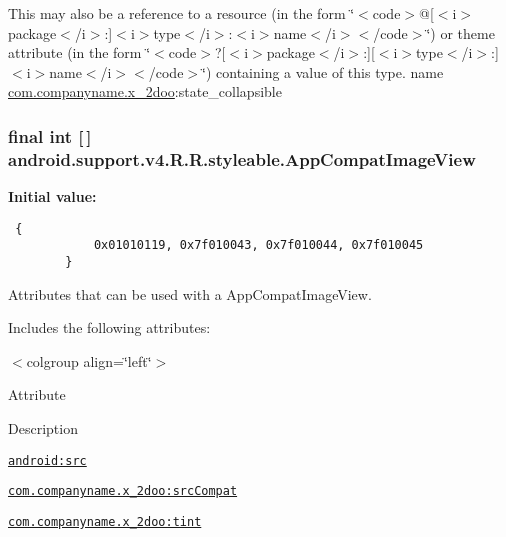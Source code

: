This may also be a reference to a resource (in the form \char`\"{}$<$code$>$@\mbox{[}$<$i$>$package$<$/i$>$:\mbox{]}$<$i$>$type$<$/i$>$:$<$i$>$name$<$/i$>$$<$/code$>$\char`\"{}) or theme attribute (in the form \char`\"{}$<$code$>$?\mbox{[}$<$i$>$package$<$/i$>$:\mbox{]}\mbox{[}$<$i$>$type$<$/i$>$:\mbox{]}$<$i$>$name$<$/i$>$$<$/code$>$\char`\"{}) containing a value of this type.  name \hyperlink{namespacecom_1_1companyname_1_1x__2doo}{com.companyname.x\_\-2doo}:state\_\-collapsible \hypertarget{classandroid_1_1support_1_1v4_1_1_r_1_1styleable_6785f800ea84c577c1f75fe389b114f0}{
\subsubsection[{AppCompatImageView}]{\setlength{\rightskip}{0pt plus 5cm}final int \mbox{[}$\,$\mbox{]} android.support.v4.R.R.styleable.AppCompatImageView}}
\label{classandroid_1_1support_1_1v4_1_1_r_1_1styleable_6785f800ea84c577c1f75fe389b114f0}


\textbf{Initial value:}

\begin{Code}\begin{verbatim} {
            0x01010119, 0x7f010043, 0x7f010044, 0x7f010045
        }
\end{verbatim}
\end{Code}
Attributes that can be used with a AppCompatImageView. 

Includes the following attributes: \begin{TabularC}{0}
\hline
\end{TabularC}
$<$colgroup align=\char`\"{}left\char`\"{}$>$ 

Attribute

Description 

{\tt \hyperlink{classandroid_1_1support_1_1v4_1_1_r_1_1styleable_dfb6d5b58f6d14c12d268d2b97125be9}{android:src}}

{\tt \hyperlink{classandroid_1_1support_1_1v4_1_1_r_1_1styleable_bc7f130ffbc0a6a871090cae86e7110f}{com.companyname.x\_\-2doo:srcCompat}}

{\tt \hyperlink{classandroid_1_1support_1_1v4_1_1_r_1_1styleable_5a59812d29ed00b03e0455481efa5f47}{com.companyname.x\_\-2doo:tint}}

